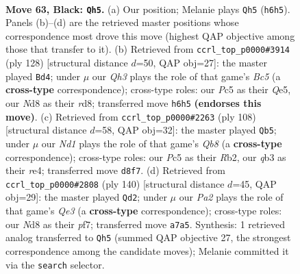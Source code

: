 \documentclass[11pt]{article}
\begin{document}
\clearpage

\begin{figure}[p]\centering
\begin{subfigure}{0.46\textwidth}\centering
\resizebox{\linewidth}{!}{%
\newchessgame
\chessboard[
  setfen={3n4/p2k2p1/1pp3pq/2p5/8/1QP5/KP6/8 b - - 3 63},
  showmover=false,
  pgfstyle=straightmove, color=movearrow, markmove={h6-h5}
]}
\caption{}
\end{subfigure}\hfill
\begin{subfigure}{0.46\textwidth}\centering
\resizebox{\linewidth}{!}{%
\newchessgame
\chessboard[
  setfen={3r2k1/5q1p/6pP/2B1Q3/p4P1P/4P1K1/8/8 w - - 15 65},
  showmover=false,
  pgfstyle=straightmove, color=movearrow, markmove={c5-d4}
]}
\caption{}
\end{subfigure}
\\[4pt]
\begin{subfigure}{0.46\textwidth}\centering
\resizebox{\linewidth}{!}{%
\newchessgame
\chessboard[
  setfen={1Q6/4qppk/7p/8/1P2r1P1/6PP/1R5K/8 w - - 3 55},
  showmover=false,
  pgfstyle=straightmove, color=movearrow, markmove={b8-b5}
]}
\caption{}
\end{subfigure}\hfill
\begin{subfigure}{0.46\textwidth}\centering
\resizebox{\linewidth}{!}{%
\newchessgame
\chessboard[
  setfen={8/3k1p2/2pq4/7p/3P1Pp1/4Q1P1/6PK/8 w - - 11 71},
  showmover=false,
  pgfstyle=straightmove, color=movearrow, markmove={e3-d2}
]}
\caption{}
\end{subfigure}
\caption{\textbf{Move 63, Black: \texttt{Qh5}.} (a) Our position; Melanie plays \texttt{Qh5} (\texttt{h6h5}). Panels (b)--(d) are the retrieved master positions whose correspondence most drove this move (highest QAP objective among those that transfer to it). (b) Retrieved from \texttt{ccrl\_top\_p0000\#3914} (ply 128) [structural distance $d$=50, QAP obj=27]: the master played \texttt{Bd4}; under $\mu$ our \emph{Qh3} plays the role of that game's \emph{Bc5} (a \textbf{cross-type} correspondence); cross-type roles: our \emph{P}c5 as their \emph{Q}e5, our \emph{N}d8 as their \emph{r}d8; transferred move \texttt{h6h5} \textbf{(endorses this move)}. (c) Retrieved from \texttt{ccrl\_top\_p0000\#2263} (ply 108) [structural distance $d$=58, QAP obj=32]: the master played \texttt{Qb5}; under $\mu$ our \emph{Nd1} plays the role of that game's \emph{Qb8} (a \textbf{cross-type} correspondence); cross-type roles: our \emph{P}c5 as their \emph{R}b2, our \emph{q}b3 as their \emph{r}e4; transferred move \texttt{d8f7}. (d) Retrieved from \texttt{ccrl\_top\_p0000\#2808} (ply 140) [structural distance $d$=45, QAP obj=29]: the master played \texttt{Qd2}; under $\mu$ our \emph{Pa2} plays the role of that game's \emph{Qe3} (a \textbf{cross-type} correspondence); cross-type roles: our \emph{N}d8 as their \emph{p}f7; transferred move \texttt{a7a5}. Synthesis: 1 retrieved analog transferred to \texttt{Qh5} (summed QAP objective 27, the strongest correspondence among the candidate moves); Melanie committed it via the \texttt{search} selector.}
\label{fig:thought-m125}
\end{figure}
\end{document}
